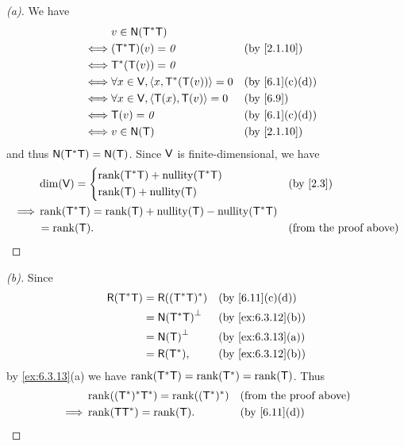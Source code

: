 \begin{proof}[(a)]
  We have
  \begin{align*}
         & v \in \ns{\T^* \T}                                                           \\
    \iff & (\T^* \T)(v) = \zv                         &  & \text{(by \cref{2.1.10})}    \\
    \iff & \T^*(\T(v)) = \zv                                                            \\
    \iff & \forall x \in \V, \inn{x, \T^*(\T(v))} = 0 &  & \text{(by \cref{6.1}(c)(d))} \\
    \iff & \forall x \in \V, \inn{\T(x), \T(v)} = 0   &  & \text{(by \cref{6.9})}       \\
    \iff & \T(v) = \zv                                &  & \text{(by \cref{6.1}(c)(d))} \\
    \iff & v \in \ns{\T}                              &  & \text{(by \cref{2.1.10})}
  \end{align*}
  and thus \(\ns{\T^* \T} = \ns{\T}\).
  Since \(\mathsf{V}\) is finite-dimensional, we have
  \begin{align*}
             & \dim(\V) = \begin{dcases}
                            \rk{\T^* \T} + \nt{\T^* \T} \\
                            \rk{\T} + \nt{\T}
                          \end{dcases}                  &  & \text{(by \cref{2.3})}               \\
    \implies & \rk{\T^* \T} = \rk{\T} + \nt{\T} - \nt{\T^* \T}                                    \\
             & = \rk{\T}.                                      &  & \text{(from the proof above)}
  \end{align*}
\end{proof}

\begin{proof}[(b)]
  Since
  \begin{align*}
    \rg{\T^* \T} & = \rg{(\T^* \T)^*}     &  & \text{(by \cref{6.11}(c)(d))}   \\
                 & = \ns{\T^* \T}^{\perp} &  & \text{(by \cref{ex:6.3.12}(b))} \\
                 & = \ns{\T}^{\perp}      &  & \text{(by \cref{ex:6.3.13}(a))} \\
                 & = \rg{\T^*},           &  & \text{(by \cref{ex:6.3.12}(b))}
  \end{align*}
  by \cref{ex:6.3.13}(a) we have \(\rk{\T^* \T} = \rk{\T^*} = \rk{\T}\).
  Thus
  \begin{align*}
             & \rk{(\T^*)^* \T^*} = \rk{(\T^*)^*} &  & \text{(from the proof above)} \\
    \implies & \rk{\T \T^*} = \rk{\T}.            &  & \text{(by \cref{6.11}(d))}
  \end{align*}
\end{proof}

